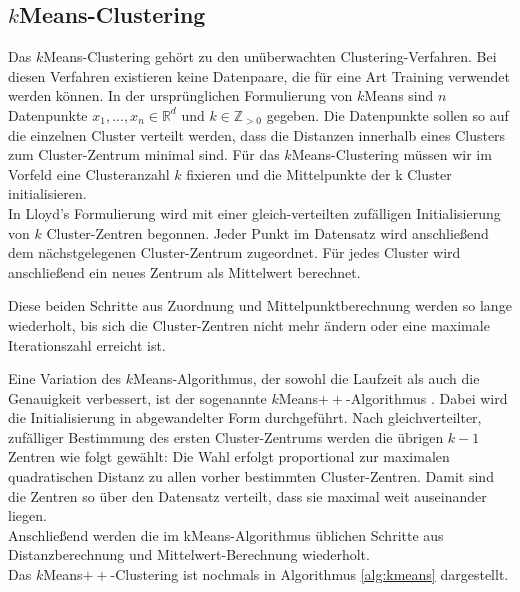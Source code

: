 \documentclass[twoside, 12pt,a4paper]{book}
\numberwithin{equation}{section}
\begin{document}
	
	
	
	
	
	
	\subsection{$k$Means-Clustering}\label{chapter:kMeans}
	Das $k$Means-Clustering gehört zu den unüberwachten Clustering-Verfahren. Bei diesen Verfahren existieren keine Datenpaare, die für eine Art Training verwendet werden können. In der ursprünglichen Formulierung von $k$Means sind $n$ Datenpunkte $x_1,...,x_n \in \mathbb{R}^d$ und $k \in \mathbb{Z}_{>0}$ gegeben. Die Datenpunkte sollen so auf die einzelnen Cluster verteilt werden, dass die Distanzen innerhalb eines Clusters zum Cluster-Zentrum minimal sind. Für das $k$Means-Clustering müssen wir im Vorfeld eine Clusteranzahl $k$ fixieren und die Mittelpunkte der k Cluster initialisieren.\\
	
	\noindent In Lloyd's Formulierung \cite{lloyd1982least} wird mit einer gleich-verteilten zufälligen Initialisierung von $k$ Cluster-Zentren begonnen. Jeder Punkt im Datensatz wird anschließend dem nächstgelegenen Cluster-Zentrum zugeordnet. Für jedes Cluster wird anschließend ein neues Zentrum als Mittelwert berechnet.
	
	\noindent Diese beiden Schritte aus Zuordnung und Mittelpunktberechnung werden so lange wiederholt, bis sich die Cluster-Zentren nicht mehr ändern oder eine maximale Iterationszahl erreicht ist.
	
	\noindent Eine Variation des $k$Means-Algorithmus, der sowohl die Laufzeit als auch die Genauigkeit verbessert, ist der sogenannte $k$Means$++$-Algorithmus \cite{kmeans++}. Dabei wird die Initialisierung in abgewandelter Form durchgeführt. Nach gleichverteilter, zufälliger Bestimmung des ersten Cluster-Zentrums werden die übrigen $k-1$ Zentren wie folgt gewählt:
	Die Wahl erfolgt proportional zur maximalen quadratischen Distanz zu allen vorher bestimmten Cluster-Zentren. Damit sind die Zentren so über den Datensatz verteilt, dass sie maximal weit auseinander liegen.\\
	
	\noindent Anschließend werden die im kMeans-Algorithmus üblichen Schritte aus Distanzberechnung und Mittelwert-Berechnung wiederholt.\\
	
	\noindent Das $k$Means$++$-Clustering ist nochmals in Algorithmus \autoref{alg:kmeans} dargestellt.
	
\end{document}
